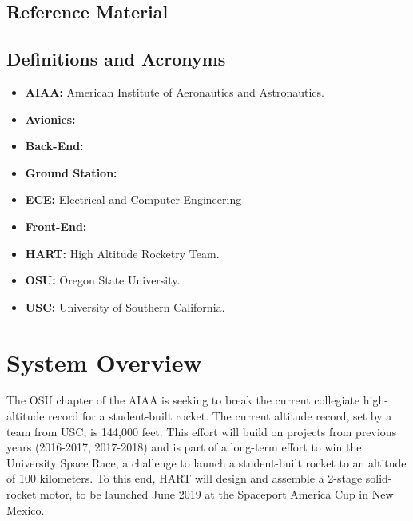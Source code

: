 \documentclass[onecolumn, draftclsnofoot,10pt, compsoc]{IEEEtran}
\begin{document}
\subsection{Reference Material}

\subsection{Definitions and Acronyms}
\begin{itemize}
	\item \textbf{AIAA:}
		American Institute of Aeronautics and Astronautics.
	\item \textbf{Avionics:}
	
	\item \textbf{Back-End:}
	
	\item \textbf{Ground Station:}
	
	\item \textbf{ECE:}
		Electrical and Computer Engineering
	\item \textbf{Front-End:}
	
	\item \textbf{HART:}
		High Altitude Rocketry Team.
	\item \textbf{OSU:}
		Oregon State University.
	\item \textbf{USC:}
		University of Southern California.
\end{itemize}
\newpage


\section{System Overview}
The OSU chapter of the AIAA is seeking to break the current collegiate high-altitude record for a student-built rocket.
The current altitude record, set by a team from USC, is 144,000 feet.
This effort will build on projects from previous years (2016-2017, 2017-2018) and is part of a long-term effort to win the University Space Race, a challenge to launch a student-built rocket to an altitude of 100 kilometers.
To this end, HART will design and assemble a 2-stage solid-rocket motor, to be launched June 2019 at the Spaceport America Cup in New Mexico. 
\end{document}
